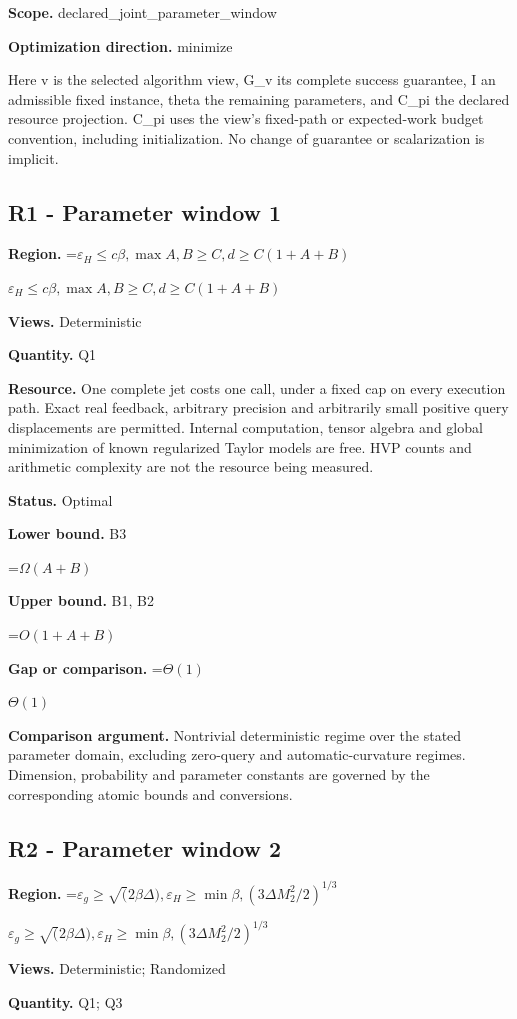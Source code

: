 \documentclass[10pt,a4paper]{article}
\newcommand{\AtlasMath}[1]{\par\begingroup\centering\setbox0=\hbox{$\displaystyle #1$}\ifdim\wd0>1.4\linewidth\typeout{ATLAS WIDE FORMULA: \the\wd0}\fi\ifdim\wd0>\linewidth\resizebox{\linewidth}{!}{\box0}\else\box0\fi\par\endgroup}
\newcommand{\AtlasInlineMath}[1]{\begingroup\setbox0=\hbox{$#1$}\ifdim\wd0>.4\linewidth\endgroup\AtlasMath{#1}\else\endgroup$#1$\fi}
\begin{document}
\textbf{Scope.} declared\_joint\_parameter\_window

\textbf{Optimization direction.} minimize

Here v is the selected algorithm view, G\_v its complete success guarantee, I an admissible fixed instance, theta the remaining parameters, and C\_pi the declared resource projection. C\_pi uses the view's fixed-path or expected-work budget convention, including initialization. No change of guarantee or scalarization is implicit.

\subsection{R1 - Parameter window 1}
\textbf{Region.} \AtlasInlineMath{\varepsilon_H\le c\beta,\max{A,B}\ge C,d\ge C(1+A+B)}

\textbf{Views.} Deterministic

\textbf{Quantity.} Q1

\textbf{Resource.} One complete jet costs one call, under a fixed cap on every execution path. Exact real feedback, arbitrary precision and arbitrarily small positive query displacements are permitted. Internal computation, tensor algebra and global minimization of known regularized Taylor models are free. HVP counts and arithmetic complexity are not the resource being measured.

\textbf{Status.} Optimal

\textbf{Lower bound.} B3

\AtlasMath{\Omega(A+B)}
\textbf{Upper bound.} B1, B2

\AtlasMath{O(1+A+B)}
\textbf{Gap or comparison.} \AtlasInlineMath{\Theta(1)}

\textbf{Comparison argument.} Nontrivial deterministic regime over the stated parameter domain, excluding zero-query and automatic-curvature regimes. Dimension, probability and parameter constants are governed by the corresponding atomic bounds and conversions.

\subsection{R2 - Parameter window 2}
\textbf{Region.} \AtlasInlineMath{\varepsilon_g\ge \sqrt(2\beta\Delta), \varepsilon_H\ge \min{\beta,(3\Delta M_2^2/2)^{1/3}}}

\textbf{Views.} Deterministic; Randomized

\textbf{Quantity.} Q1; Q3
\end{document}
